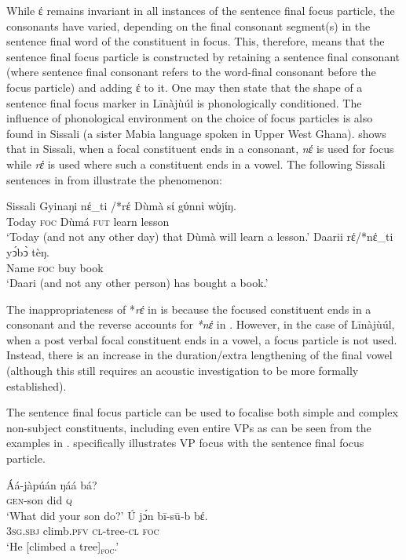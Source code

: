 \documentclass[output=paper,colorlinks,citecolor=brown]{langscibook}
\begin{document}
While έ remains invariant in all instances of the sentence final focus particle, the consonants have varied, depending on the final consonant segment(s) in the sentence final word of the constituent in focus. This, therefore, means that the sentence final focus particle is constructed by retaining a sentence final consonant (where sentence final consonant refers to the word-final consonant before the focus particle) and adding έ to it. One may then state that the shape of a sentence final focus marker in Līnàjùúl is phonologically conditioned. The influence of phonological environment on the choice of focus particles is also found in Sissali (a sister Mabia language spoken in Upper West Ghana). \citet{Dumah2017} shows that in Sissali, when a focal constituent ends in a consonant, \textit{nέ} is used for focus while \textit{rέ} is used where such a constituent ends in a vowel. The following Sissali sentences in  from \citet{Dumah2017} illustrate the phenomenon:

\ea%
    \label{ex:bisilki:18}
    Sissali \citep[84]{Dumah2017}
    \ea\label{ex:bisilki:18a}
    \gll    Gyinaŋi	nέ\_ti /*rέ	Dùmà		sί	gύnnὶ wὺjίŋ.\\
            Today		\textsc{foc} {} {}		Dùmá 		\textsc{fut} 	 learn 	        lesson\\
    \glt    ‘Today (and not any other day) that Dùmà will learn a lesson.’
    \ex\label{ex:bisilki:18b}
    \gll    Daarii		rέ/*nέ\_ti	yↄ́bↄ̀	 tèŋ.\\
            Name		\textsc{foc} {}		buy	book\\
    \glt    ‘Daari (and not any other person) has bought a book.’
    \z
\z

The inappropriateness of *\textit{rέ} in  is because the focused constituent ends in a consonant and the reverse accounts for \textit{*nέ} in . However, in the case of Līnàjùúl, when a post verbal focal constituent ends in a vowel, a focus particle is not used. Instead, there is an increase in the duration/extra lengthening of the final vowel (although this still requires an acoustic investigation to be more formally established).

The sentence final focus particle can be used to focalise both simple and complex non-subject constituents, including even entire VPs as can be seen from the examples in .  specifically illustrates VP focus with the sentence final focus particle.

\ea%
    \label{ex:bisilki:19}
    \ea\label{ex:bisilki:19a}
    \gll    Áá-jàpúán	ŋáá	bá?\\
            \textsc{gen-}son	did	\textsc{q}\\
    \glt    ‘What did your son do?’
    \ex\label{ex:bisilki:19b}
    \gll    Ú		jɔ́n		bī-sū-b	bέ.\\
            \textsc{3sg.sbj}	climb\textsc{.pfv}	\textsc{cl-}tree\textsc{-cl}	\textsc{foc}\\
    \glt    ‘He [climbed a tree]\textsubscript{\textsc{foc}}.’
    \z
\z
\end{document}
